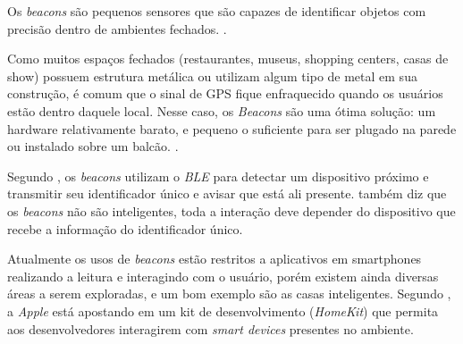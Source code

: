 \documentclass[
	12pt,				%
	openright,			%
	oneside,			%
	a4paper,			%
	chapter=TITLE,		%
	english,			%
	brazil				%
	]{abntex2}
\begin{document}
{Os \textit{beacons} são pequenos sensores que são capazes de identificar objetos com precisão dentro de ambientes fechados. \cite{teixeira-beacon}.

\begin{citacao}
Como muitos espaços fechados (restaurantes, museus, shopping centers, casas de show) possuem estrutura metálica ou utilizam algum tipo de metal em sua construção, é comum que o sinal de GPS fique enfraquecido quando os usuários estão dentro daquele local. Nesse caso, os \textit{Beacons} são uma ótima solução: um hardware relativamente barato, e pequeno o suficiente para ser plugado na parede ou instalado sobre um balcão. \cite{teixeira-beacon}.
\end{citacao}

\begin{figure}[h!]
\end{figure}

Segundo , os \textit{beacons} utilizam o \textit{BLE} para detectar um dispositivo próximo e transmitir seu identificador único e avisar que está ali presente.  também diz que os \textit{beacons} não são inteligentes, toda a interação deve depender do dispositivo que recebe a informação do identificador único.

Atualmente os usos de \textit{beacons} estão restritos a aplicativos em smartphones realizando a leitura e interagindo com o usuário, porém existem ainda diversas áreas a serem exploradas, e um bom exemplo são as casas inteligentes. Segundo , a \textit{Apple} está apostando em um kit de desenvolvimento (\textit{HomeKit}) que permita aos desenvolvedores interagirem com \textit{smart devices} presentes no ambiente.

}
\end{document}
